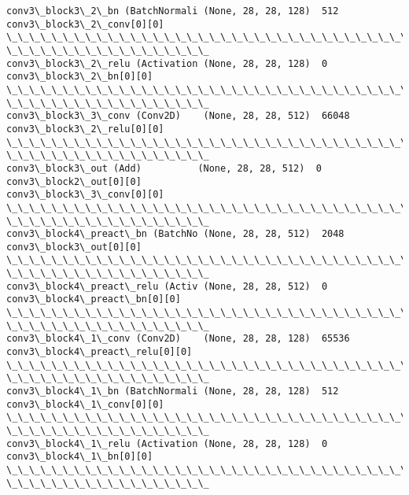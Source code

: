 \documentclass[11pt]{article}
\begin{document}
\begin{Verbatim}[commandchars=\\\{\}]
conv3\_block3\_2\_bn (BatchNormali (None, 28, 28, 128)  512
conv3\_block3\_2\_conv[0][0]
\_\_\_\_\_\_\_\_\_\_\_\_\_\_\_\_\_\_\_\_\_\_\_\_\_\_\_\_\_\_\_\_\_\_\_\_\_\_\_\_\_\_\_\_\_\_\_\_\_\_\_\_\_\_\_\_\_\_\_\_\_\_\_\_\_\_\_\_\_\_\_\_\_\_\_\_\_\_\_\_
\_\_\_\_\_\_\_\_\_\_\_\_\_\_\_\_\_\_
conv3\_block3\_2\_relu (Activation (None, 28, 28, 128)  0
conv3\_block3\_2\_bn[0][0]
\_\_\_\_\_\_\_\_\_\_\_\_\_\_\_\_\_\_\_\_\_\_\_\_\_\_\_\_\_\_\_\_\_\_\_\_\_\_\_\_\_\_\_\_\_\_\_\_\_\_\_\_\_\_\_\_\_\_\_\_\_\_\_\_\_\_\_\_\_\_\_\_\_\_\_\_\_\_\_\_
\_\_\_\_\_\_\_\_\_\_\_\_\_\_\_\_\_\_
conv3\_block3\_3\_conv (Conv2D)    (None, 28, 28, 512)  66048
conv3\_block3\_2\_relu[0][0]
\_\_\_\_\_\_\_\_\_\_\_\_\_\_\_\_\_\_\_\_\_\_\_\_\_\_\_\_\_\_\_\_\_\_\_\_\_\_\_\_\_\_\_\_\_\_\_\_\_\_\_\_\_\_\_\_\_\_\_\_\_\_\_\_\_\_\_\_\_\_\_\_\_\_\_\_\_\_\_\_
\_\_\_\_\_\_\_\_\_\_\_\_\_\_\_\_\_\_
conv3\_block3\_out (Add)          (None, 28, 28, 512)  0
conv3\_block2\_out[0][0]
conv3\_block3\_3\_conv[0][0]
\_\_\_\_\_\_\_\_\_\_\_\_\_\_\_\_\_\_\_\_\_\_\_\_\_\_\_\_\_\_\_\_\_\_\_\_\_\_\_\_\_\_\_\_\_\_\_\_\_\_\_\_\_\_\_\_\_\_\_\_\_\_\_\_\_\_\_\_\_\_\_\_\_\_\_\_\_\_\_\_
\_\_\_\_\_\_\_\_\_\_\_\_\_\_\_\_\_\_
conv3\_block4\_preact\_bn (BatchNo (None, 28, 28, 512)  2048
conv3\_block3\_out[0][0]
\_\_\_\_\_\_\_\_\_\_\_\_\_\_\_\_\_\_\_\_\_\_\_\_\_\_\_\_\_\_\_\_\_\_\_\_\_\_\_\_\_\_\_\_\_\_\_\_\_\_\_\_\_\_\_\_\_\_\_\_\_\_\_\_\_\_\_\_\_\_\_\_\_\_\_\_\_\_\_\_
\_\_\_\_\_\_\_\_\_\_\_\_\_\_\_\_\_\_
conv3\_block4\_preact\_relu (Activ (None, 28, 28, 512)  0
conv3\_block4\_preact\_bn[0][0]
\_\_\_\_\_\_\_\_\_\_\_\_\_\_\_\_\_\_\_\_\_\_\_\_\_\_\_\_\_\_\_\_\_\_\_\_\_\_\_\_\_\_\_\_\_\_\_\_\_\_\_\_\_\_\_\_\_\_\_\_\_\_\_\_\_\_\_\_\_\_\_\_\_\_\_\_\_\_\_\_
\_\_\_\_\_\_\_\_\_\_\_\_\_\_\_\_\_\_
conv3\_block4\_1\_conv (Conv2D)    (None, 28, 28, 128)  65536
conv3\_block4\_preact\_relu[0][0]
\_\_\_\_\_\_\_\_\_\_\_\_\_\_\_\_\_\_\_\_\_\_\_\_\_\_\_\_\_\_\_\_\_\_\_\_\_\_\_\_\_\_\_\_\_\_\_\_\_\_\_\_\_\_\_\_\_\_\_\_\_\_\_\_\_\_\_\_\_\_\_\_\_\_\_\_\_\_\_\_
\_\_\_\_\_\_\_\_\_\_\_\_\_\_\_\_\_\_
conv3\_block4\_1\_bn (BatchNormali (None, 28, 28, 128)  512
conv3\_block4\_1\_conv[0][0]
\_\_\_\_\_\_\_\_\_\_\_\_\_\_\_\_\_\_\_\_\_\_\_\_\_\_\_\_\_\_\_\_\_\_\_\_\_\_\_\_\_\_\_\_\_\_\_\_\_\_\_\_\_\_\_\_\_\_\_\_\_\_\_\_\_\_\_\_\_\_\_\_\_\_\_\_\_\_\_\_
\_\_\_\_\_\_\_\_\_\_\_\_\_\_\_\_\_\_
conv3\_block4\_1\_relu (Activation (None, 28, 28, 128)  0
conv3\_block4\_1\_bn[0][0]
\_\_\_\_\_\_\_\_\_\_\_\_\_\_\_\_\_\_\_\_\_\_\_\_\_\_\_\_\_\_\_\_\_\_\_\_\_\_\_\_\_\_\_\_\_\_\_\_\_\_\_\_\_\_\_\_\_\_\_\_\_\_\_\_\_\_\_\_\_\_\_\_\_\_\_\_\_\_\_\_
\_\_\_\_\_\_\_\_\_\_\_\_\_\_\_\_\_\_

\end{Verbatim}
\end{document}
